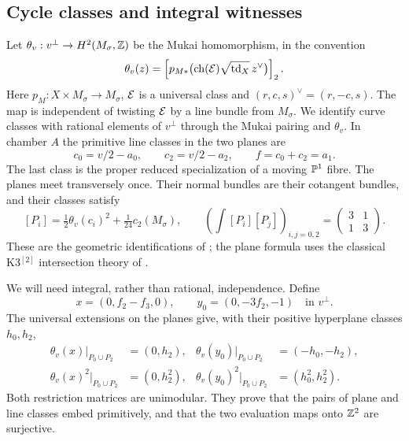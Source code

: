 \subsection{Cycle classes and integral witnesses}
Let $\theta_v:v^\perp\to H^2(M_\sigma,\mathbb Z)$ be the Mukai
homomorphism, in the convention
\begin{equation}\label{eq:theta}
 \theta_v(z)=
 \left[p_{M*}\bigl(\operatorname{ch}(\mathcal E)\sqrt{\operatorname{td}_X}\,z^\vee\bigr)\right]_2.
\end{equation}
Here $p_M:X\times M_\sigma\to M_\sigma$, $\mathcal E$ is a universal
class and $(r,c,s)^\vee=(r,-c,s)$. The map is independent of twisting
$\mathcal E$ by a line bundle from $M_\sigma$. We identify curve classes
with rational elements of $v^\perp$ through the Mukai pairing and
$\theta_v$. In chamber $A$ the primitive line classes in the two
planes are
\begin{equation}\label{eq:curves}
 c_0=v/2-a_0,\qquad c_2=v/2-a_2,\qquad
 f=c_0+c_2=a_1.
\end{equation}
The last class is the proper reduced specialization of a moving
$\mathbb P^1$ fibre. The planes meet transversely once. Their normal bundles
are their cotangent bundles, and their classes satisfy
\begin{equation}\label{eq:plane-formula}
 [P_i]=\tfrac12\theta_v(c_i)^2+\tfrac1{24}c_2(M_\sigma),\qquad
 \left(\int [P_i][P_j]\right)_{i,j=0,2}
 =\begin{pmatrix}3&1\\1&3\end{pmatrix}.
\end{equation}
These are the geometric identifications of
\cite[\S\S5--6]{wuebben17}; the plane formula uses the classical
K3$^{[2]}$ intersection theory of \cite{ht}.

We will need integral, rather than rational, independence. Define
\begin{equation}\label{eq:witness}
 x=(0,f_2-f_3,0),\qquad y_0=(0,-3f_2,-1)\quad\text{in }v^\perp.
\end{equation}
The universal extensions on the planes give, with their positive
hyperplane classes $h_0,h_2$,
\begin{equation}\label{eq:witness-restrictions}
 \begin{aligned}
 \theta_v(x)|_{P_0\cup P_2}&=(0,h_2),&
 \theta_v(y_0)|_{P_0\cup P_2}&=(-h_0,-h_2),\\
 \theta_v(x)^2|_{P_0\cup P_2}&=(0,h_2^2),&
 \theta_v(y_0)^2|_{P_0\cup P_2}&=(h_0^2,h_2^2).
 \end{aligned}
\end{equation}
Both restriction matrices are unimodular. They prove that the pairs
of plane and line classes embed primitively, and that the two
evaluation maps onto $\mathbb Z^2$ are surjective.

